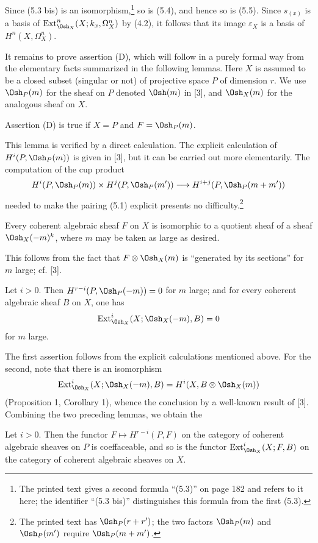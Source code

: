Since (5.3 bis) is an isomorphism,\footnote{The printed text gives a second
formula ``(5.3)'' on page 182 and refers to it here; the identifier
``(5.3 bis)'' distinguishes this formula from the first (5.3).} so is (5.4),
and hence so is (5.5). Since $s_{(x)}$ is a basis of
$\operatorname{Ext}_{\Osh_X}^{n}(X;k_x,\Omega_X^{n})$ by (4.2), it follows that
its image $\varepsilon_X$ is a basis of $H^{n}(X,\Omega_X^{n})$.

It remains to prove assertion (D), which will follow in a purely formal way
from the elementary facts summarized in the following lemmas. Here $X$ is
assumed to be a closed subset (singular or not) of projective space $P$ of
dimension $r$. We use $\Osh_P(m)$ for the sheaf on $P$ denoted $\Osh(m)$ in
[3], and $\Osh_X(m)$ for the analogous sheaf on $X$.

 Assertion (D) is true if $X=P$ and $F=\Osh_P(m)$.

This lemma is verified by a direct calculation. The explicit calculation of
$H^{i}(P,\Osh_P(m))$ is given in [3], but it can be carried out more
elementarily. The computation of the cup product
\[
  H^{i}(P,\Osh_P(m))\times H^{j}(P,\Osh_P(m'))
  \longrightarrow H^{i+j}(P,\Osh_P(m+m'))
\]
needed to make the pairing (5.1) explicit presents no
difficulty.\footnote{The printed text has $\Osh_P(r+r')$; the two factors
$\Osh_P(m)$ and $\Osh_P(m')$ require $\Osh_P(m+m')$.}

 Every coherent algebraic sheaf $F$ on $X$ is isomorphic to a
quotient sheaf of a sheaf $\Osh_X(-m)^{k}$, where $m$ may be taken as large as
desired.

This follows from the fact that $F\otimes\Osh_X(m)$ is ``generated by its
sections'' for $m$ large; cf. [3].

 Let $i>0$. Then
$H^{r-i}(P,\Osh_P(-m))=0$ for $m$ large; and for every coherent algebraic sheaf
$B$ on $X$, one has
\[
  \operatorname{Ext}_{\Osh_X}^{i}(X;\Osh_X(-m),B)=0
\]
for $m$ large.

The first assertion follows from the explicit calculations mentioned above.
For the second, note that there is an isomorphism
\[
  \operatorname{Ext}_{\Osh_X}^{i}(X;\Osh_X(-m),B)
  =H^{i}(X,B\otimes\Osh_X(m))
\]
(Proposition 1, Corollary 1), whence the conclusion by a well-known result of
[3]. Combining the two preceding lemmas, we obtain the

 Let $i>0$. Then the functor
$F\longmapsto H^{r-i}(P,F)$ on the category of coherent algebraic sheaves on
$P$ is coeffaceable, and so is the functor
$\operatorname{Ext}_{\Osh_X}^{i}(X;F,B)$ on the category of coherent algebraic
sheaves on $X$.

